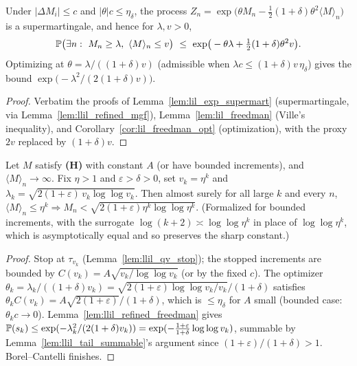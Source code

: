 \begin{lemma}\label{lem:llil_refined_freedman}
\leanok
{}
Under $|\Delta M_i|\le c$ and $|\theta|c\le\eta_\delta$, the process
$Z_n=\exp\!\big(\theta M_n-\tfrac12(1+\delta)\theta^2\langle M\rangle_n\big)$ is a
supermartingale, and hence for $\lambda,v>0$,
\[
  \Prob\big(\exists n:\ M_n\ge\lambda,\ \langle M\rangle_n\le v\big)\ \le\
  \exp\!\big(-\theta\lambda+\tfrac12(1+\delta)\theta^2 v\big).
\]
Optimizing at $\theta=\lambda/((1+\delta)v)$ (admissible when
$\lambda c\le(1+\delta)v\,\eta_\delta$) gives the bound
$\exp\!\big(-\lambda^2/(2(1+\delta)v)\big)$.
\end{lemma}
\begin{proof}
Verbatim the proofs of Lemma~\ref{lem:lil_exp_supermart} (supermartingale, via
Lemma~\ref{lem:llil_refined_mgf}), Lemma~\ref{lem:lil_freedman} (Ville's inequality),
and Corollary~\ref{cor:lil_freedman_opt} (optimization), with the proxy $2v$ replaced
by $(1+\delta)v$.
\end{proof}

\begin{lemma}[Sharp exceedance]\label{lem:llil_sharp_block}
\leanok
{}
Let $M$ satisfy \textbf{(H)} with constant $A$ (or have bounded increments), and
$\langle M\rangle_n\to\infty$. Fix $\eta>1$ and $\varepsilon>\delta>0$, set $v_k=\eta^k$
and $\lambda_k=\sqrt{2(1+\varepsilon)\,v_k\log\log v_k}$. Then almost surely for all
large $k$ and every $n$,
$\langle M\rangle_n\le\eta^k\Rightarrow M_n<\sqrt{2(1+\varepsilon)\eta^k\log\log\eta^k}$.
(Formalized for bounded increments, with the surrogate $\log(k+2)\asymp\log\log\eta^k$ in place of
$\log\log\eta^k$, which is asymptotically equal and so preserves the sharp constant.)
\end{lemma}
\begin{proof}
Stop at $\tau_{v_k}$ (Lemma~\ref{lem:llil_qv_stop}); the stopped increments are bounded
by $C(v_k)=A\sqrt{v_k/\log\log v_k}$ (or by the fixed $c$). The optimizer
$\theta_k=\lambda_k/((1+\delta)v_k)=\sqrt{2(1+\varepsilon)\log\log v_k/v_k}/(1+\delta)$
satisfies $\theta_k C(v_k)=A\sqrt{2(1+\varepsilon)}/(1+\delta)$, which is $\le\eta_\delta$
for $A$ small (bounded case: $\theta_k c\to0$). Lemma~\ref{lem:llil_refined_freedman}
gives $\mathbb{P}(s_k)\le\exp(-\lambda_k^2/(2(1+\delta)v_k))
=\exp(-\tfrac{1+\varepsilon}{1+\delta}\log\log v_k)$, summable by
Lemma~\ref{lem:llil_tail_summable}'s argument since $(1+\varepsilon)/(1+\delta)>1$.
Borel--Cantelli finishes.
\end{proof}

